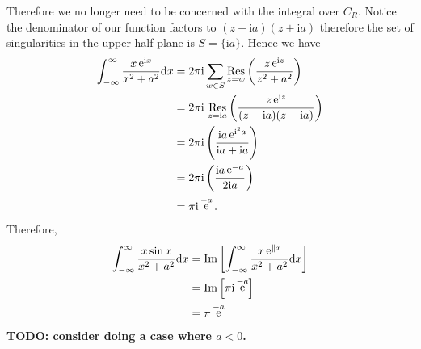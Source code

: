 \documentclass[10pt]{amsart}
\newcommand{\D}{\mathrm{d}}
\newcommand{\I}{\mathrm{i}}
\DeclareMathOperator{\E}{e}
\theoremstyle{nonumberplain}
\begin{document}
\begin{enumerate}[label={\bf {\arabic*}:}]
\noindent
Therefore we no longer need to be concerned with the integral over $C_R$.
Notice the denominator of our function factors to $(z - \I a)(z + \I a)$ therefore the set of singularities in the upper half plane is $S = \{ \I a \} $.
Hence we have
\begin{align*}
\int_{-\infty}^{\infty} \frac {x \E^{\I x}}{x^2 + a^2 } \D x
	&= 2 \pi \I \sum_{w \in S} \underset{z = w }{ \rm Res } \left( \frac {z \E^{\I z}}{z^2 + a^2 } \right) \\
	&= 2 \pi \I \, \, \underset{z = \I a }{ \rm Res } \left( \frac {z \E^{\I z}}{(z - \I a)(z + \I a) } \right) \\
	&= 2 \pi \I \left( \frac {\I a \E^{\I^2 a}}{ \I a + \I a } \right) \\
	&= 2 \pi \I \left( \frac {\I a \E^{- a}}{ 2 \I a } \right) \\
	&= \pi \I \E^{- a}.
\end{align*}
Therefore,
\begin{align*}
\int_{-\infty}^{\infty} \frac {x \sin x}{x^2 + a^2 } \D x
	&= { \rm Im } \left[ \int_{-\infty}^{\infty} \frac {x \E^{\| x}}{x^2 + a^2 } \D x \right] \\
	&= { \rm Im } \left[ \pi \I \E^{- a} \right] \\
	&= \pi \E^{- a}
\end{align*}
\textbf{TODO: consider doing a case where $a < 0$.} \\



\end{enumerate}
\end{document}
